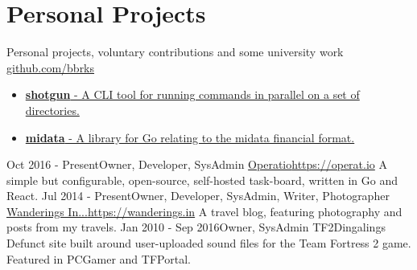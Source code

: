 \documentclass[11pt,a4paper]{moderncv}
\begin{document}
	\section{Personal Projects}
		\cventry
			{}{Personal projects, voluntary contributions and some university work}
			{\href{https://github.com/bbrks}{github.com/bbrks}}{}
			{}{\begin{itemize}
				\item \href{https://github.com/bbrks/shotgun}{\textbf{shotgun} - A CLI tool for running commands in parallel on a set of directories.}
				\item \href{https://github.com/bbrks/midata}{\textbf{midata} - A library for Go relating to the midata financial format.}
			\end{itemize}}
		\cventry
			{Oct 2016 - Present}{Owner, Developer, SysAdmin}
			{\href{https://operat.io}{Operatio}}{\url{https://operat.io}}
			{}{A simple but configurable, open-source, self-hosted task-board, written in Go and React.}
		\cventry
			{Jul 2014 - Present}{Owner, Developer, SysAdmin, Writer, Photographer}
			{\href{https://wanderings.in}{Wanderings In...}}{\url{https://wanderings.in}}
			{}{A travel blog, featuring photography and posts from my travels.}
		\cventry
			{Jan 2010 - Sep 2016}{Owner, SysAdmin}
			{TF2Dingalings}{}
			{}{Defunct site built around user-uploaded sound files for the Team Fortress 2 game.\newline{}
			Featured in PCGamer and TFPortal.}
\end{document}
